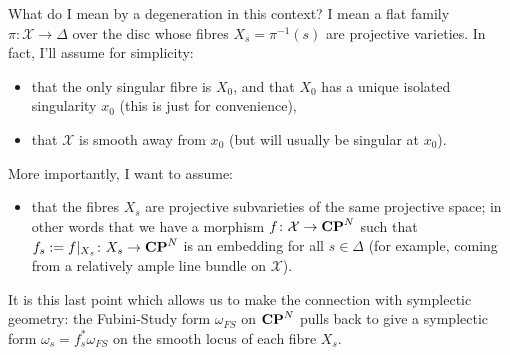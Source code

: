 \documentclass{article}
\begin{document}
What do I mean by a degeneration in this context? I mean a flat family
\(\pi\colon\mathcal{X}\to\Delta\) over the disc whose fibres
\(X_s=\pi^{-1}(s)\) are projective varieties. In fact, I'll assume for
simplicity:
\begin{itemize}
\item that the only singular fibre is \(X_0\), and that \(X_0\) has a
unique isolated singularity \(x_0\) (this is just for convenience),
\item that \(\mathcal{X}\) is smooth away from \(x_0\) (but will usually
be singular at \(x_0\)).
\end{itemize}
More importantly, I want to assume:
\begin{itemize}
\item that the fibres \(X_s\) are projective subvarieties of the same
projective space; in other words that we have a morphism
\(f\colon\mathcal{X}\to\mathbf{CP}^{N}\) such that \(f_s:=f|_{X_s}\colon
X_s\to\mathbf{CP}^{N}\) is an embedding for all \(s\in\Delta\) (for example,
coming from a relatively ample line bundle on \(\mathcal{X}\)).
\end{itemize}
It is this last point which allows us to make the connection with
symplectic geometry: the Fubini-Study form \(\omega_{FS}\) on
\(\mathbf{CP}^{N}\) pulls back to give a symplectic form
\(\omega_s=f_s^*\omega_{FS}\) on the smooth locus of each fibre
\(X_s\).
\end{document}
